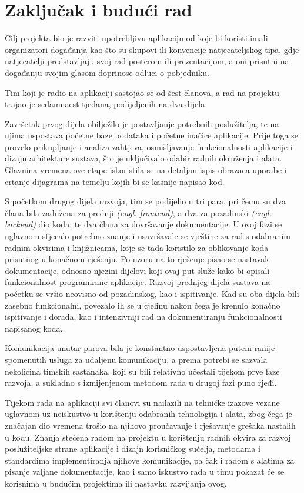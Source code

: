 \chapter{Zaključak i budući rad}
		 
		 Cilj projekta bio je razviti upotrebljivu aplikaciju od koje bi koristi imali organizatori događanja kao što su skupovi ili konvencije natjecateljskog tipa, gdje natjecatelji predstavljaju svoj rad posterom ili prezentacijom, a oni prisutni na događanju svojim glasom doprinose odluci o pobjedniku.
		 
		 Tim koji je radio na aplikaciji sastojao se od šest članova, a rad na projektu trajao je sedamnaest tjedana, podijeljenih na dva dijela.
		 
		 Završetak prvog dijela obilježilo je postavljanje potrebnih poslužitelja, te na njima uspostava početne baze podataka i početne inačice aplikacije. Prije toga se provelo prikupljanje i analiza zahtjeva, osmišljavanje funkcionalnosti aplikacije i dizajn arhitekture sustava, što je uključivalo odabir radnih okruženja i alata. Glavnina vremena ove etape iskoristila se na detaljan ispis obrazaca uporabe i crtanje dijagrama na temelju kojih bi se kasnije napisao kod.
		 
		 S početkom drugog dijela razvoja, tim se podijelio u tri para, pri čemu su dva člana bila zadužena za prednji \textit{(engl. frontend)}, a dva za pozadinski \textit{(engl. backend)} dio koda, te dva člana za dovršavanje dokumentacije. U ovoj fazi se uglavnom stjecalo potrebno znanje i usavršavale se vještine za rad s odabranim radnim okvirima i knjižnicama, koje se tada koristilo za oblikovanje koda prisutnog u konačnom rješenju. Po uzoru na to rješenje pisao se nastavak dokumentacije, odnosno njezini dijelovi koji ovaj put služe kako bi opisali funkcionalnost programirane aplikacije. Razvoj prednjeg dijela sustava na početku se vršio neovisno od pozadinskog, kao i ispitivanje. Kad su oba dijela bili zasebno funkcionalni, povezalo ih se u cjelinu nakon čega je krenulo konačno ispitivanje i dorada, kao i intenzivniji rad na dokumentiranju funkcionalnosti napisanog koda.
		 
		 Komunikacija unutar parova bila je konstantno uspostavljena putem ranije spomenutih usluga za udaljenu komunikaciju, a prema potrebi se sazvala nekolicina timskih sastanaka, koji su bili relativno učestali tijekom prve faze razvoja, a sukladno s izmijenjenom metodom rada u drugoj fazi puno rjeđi.
		 
		 Tijekom rada na aplikaciji svi članovi su nailazili na tehničke izazove vezane uglavnom uz neiskustvo u korištenju odabranih tehnologija i alata, zbog čega je značajan dio vremena trošio na njihovo proučavanje i rješavanje grešaka nastalih u kodu. Znanja stečena radom na projektu u korištenju radnih okvira za razvoj poslužiteljske strane aplikacije i dizajn korisničkog sučelja, metodama i standardima implementiranja njihove komunikacije, pa čak i radom s alatima za pisanje valjane dokumentacije, kao i samo iskustvo rada u timu pokazat će se korisnima u budućim projektima ili nastavku razvijanja ovog.
		 
